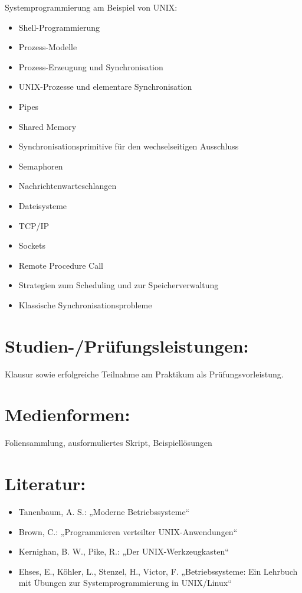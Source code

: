 Systemprogrammierung am Beispiel von UNIX:

\begin{itemize}
\item
  Shell-Programmierung
\item
  Prozess-Modelle
\item
  Prozess-Erzeugung und Synchronisation
\item
  UNIX-Prozesse und elementare Synchronisation
\item
  Pipes
\item
  Shared Memory
\item
  Synchronisationsprimitive für den wechselseitigen Ausschluss
\item
  Semaphoren
\item
  Nachrichtenwarteschlangen
\item
  Dateisysteme
\item
  TCP/IP
\item
  Sockets
\item
  Remote Procedure Call
\item
  Strategien zum Scheduling und zur Speicherverwaltung
\item
  Klassische Synchronisationsprobleme
\end{itemize}

\section*{Studien-/Prüfungsleistungen:}\label{studien-pruxfcfungsleistungen-2}

Klausur sowie erfolgreiche Teilnahme am Praktikum als
Prüfungsvorleistung.

\section*{Medienformen:}\label{medienformen-1}

Foliensammlung, ausformuliertes Skript, Beispiellösungen

\section*{Literatur:}\label{literatur-3}

\begin{itemize}
\item
  Tanenbaum, A. S.: „Moderne Betriebssysteme``
\item
  Brown, C.: „Programmieren verteilter UNIX-Anwendungen``
\item
  Kernighan, B. W., Pike, R.: „Der UNIX-Werkzeugkasten``
\item
  Ehses, E., Köhler, L., Stenzel, H., Victor, F. „Betriebssysteme: Ein
  Lehrbuch mit Übungen zur Systemprogrammierung in UNIX/Linux``
\end{itemize}

